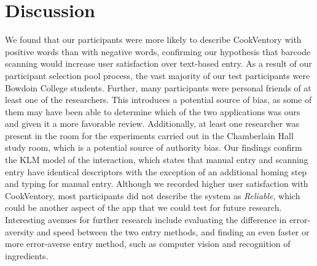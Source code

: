 \documentclass{sigchi}
\begin{document}
\section{Discussion}\label{discussion}
	We found that our participants were more likely to describe CookVentory with positive words than with negative words, confirming our hypothesis that barcode scanning would increase user satisfaction over text-based entry.
	As a result of our participant selection pool process, the vast majority of our test participants were Bowdoin College students. Further, many participants were personal friends of at least one of the researchers. This introduces a potential source of bias, as some of them may have been able to determine which of the two applications was ours and given it a more favorable review. Additionally, at least one researcher was present in the room for the experiments carried out in the Chamberlain Hall study room, which is a potential source of authority bias.
	Our findings confirm the KLM model of the interaction, which states that manual entry and scanning entry have identical descriptors with the exception of an additional homing step and typing for manual entry. Although we recorded higher user satisfaction with CookVentory, most participants did not describe the system as \textit{Reliable}, which could be another aspect of the app that we could test for future research. Interesting avenues for further research include evaluating the difference in error-aversity and speed between the two entry methods, and finding an even faster or more error-averse entry method, such as computer vision and recognition of ingredients. 

\balance{} %


\end{document}
